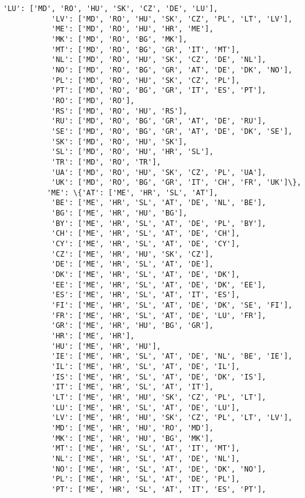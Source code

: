 \documentclass[11pt]{article}
\begin{document}
\begin{Verbatim}[commandchars=\\\{\}]
           'LU': ['MD', 'RO', 'HU', 'SK', 'CZ', 'DE', 'LU'],
           'LV': ['MD', 'RO', 'HU', 'SK', 'CZ', 'PL', 'LT', 'LV'],
           'ME': ['MD', 'RO', 'HU', 'HR', 'ME'],
           'MK': ['MD', 'RO', 'BG', 'MK'],
           'MT': ['MD', 'RO', 'BG', 'GR', 'IT', 'MT'],
           'NL': ['MD', 'RO', 'HU', 'SK', 'CZ', 'DE', 'NL'],
           'NO': ['MD', 'RO', 'BG', 'GR', 'AT', 'DE', 'DK', 'NO'],
           'PL': ['MD', 'RO', 'HU', 'SK', 'CZ', 'PL'],
           'PT': ['MD', 'RO', 'BG', 'GR', 'IT', 'ES', 'PT'],
           'RO': ['MD', 'RO'],
           'RS': ['MD', 'RO', 'HU', 'RS'],
           'RU': ['MD', 'RO', 'BG', 'GR', 'AT', 'DE', 'RU'],
           'SE': ['MD', 'RO', 'BG', 'GR', 'AT', 'DE', 'DK', 'SE'],
           'SK': ['MD', 'RO', 'HU', 'SK'],
           'SL': ['MD', 'RO', 'HU', 'HR', 'SL'],
           'TR': ['MD', 'RO', 'TR'],
           'UA': ['MD', 'RO', 'HU', 'SK', 'CZ', 'PL', 'UA'],
           'UK': ['MD', 'RO', 'BG', 'GR', 'IT', 'CH', 'FR', 'UK']\},
          'ME': \{'AT': ['ME', 'HR', 'SL', 'AT'],
           'BE': ['ME', 'HR', 'SL', 'AT', 'DE', 'NL', 'BE'],
           'BG': ['ME', 'HR', 'HU', 'BG'],
           'BY': ['ME', 'HR', 'SL', 'AT', 'DE', 'PL', 'BY'],
           'CH': ['ME', 'HR', 'SL', 'AT', 'DE', 'CH'],
           'CY': ['ME', 'HR', 'SL', 'AT', 'DE', 'CY'],
           'CZ': ['ME', 'HR', 'HU', 'SK', 'CZ'],
           'DE': ['ME', 'HR', 'SL', 'AT', 'DE'],
           'DK': ['ME', 'HR', 'SL', 'AT', 'DE', 'DK'],
           'EE': ['ME', 'HR', 'SL', 'AT', 'DE', 'DK', 'EE'],
           'ES': ['ME', 'HR', 'SL', 'AT', 'IT', 'ES'],
           'FI': ['ME', 'HR', 'SL', 'AT', 'DE', 'DK', 'SE', 'FI'],
           'FR': ['ME', 'HR', 'SL', 'AT', 'DE', 'LU', 'FR'],
           'GR': ['ME', 'HR', 'HU', 'BG', 'GR'],
           'HR': ['ME', 'HR'],
           'HU': ['ME', 'HR', 'HU'],
           'IE': ['ME', 'HR', 'SL', 'AT', 'DE', 'NL', 'BE', 'IE'],
           'IL': ['ME', 'HR', 'SL', 'AT', 'DE', 'IL'],
           'IS': ['ME', 'HR', 'SL', 'AT', 'DE', 'DK', 'IS'],
           'IT': ['ME', 'HR', 'SL', 'AT', 'IT'],
           'LT': ['ME', 'HR', 'HU', 'SK', 'CZ', 'PL', 'LT'],
           'LU': ['ME', 'HR', 'SL', 'AT', 'DE', 'LU'],
           'LV': ['ME', 'HR', 'HU', 'SK', 'CZ', 'PL', 'LT', 'LV'],
           'MD': ['ME', 'HR', 'HU', 'RO', 'MD'],
           'MK': ['ME', 'HR', 'HU', 'BG', 'MK'],
           'MT': ['ME', 'HR', 'SL', 'AT', 'IT', 'MT'],
           'NL': ['ME', 'HR', 'SL', 'AT', 'DE', 'NL'],
           'NO': ['ME', 'HR', 'SL', 'AT', 'DE', 'DK', 'NO'],
           'PL': ['ME', 'HR', 'SL', 'AT', 'DE', 'PL'],
           'PT': ['ME', 'HR', 'SL', 'AT', 'IT', 'ES', 'PT'],

\end{Verbatim}
\end{document}
